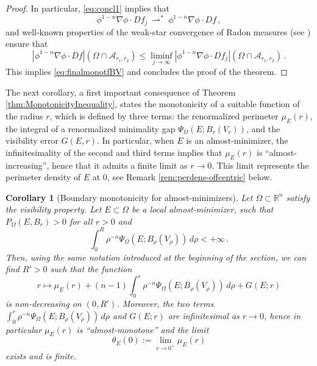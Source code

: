 \documentclass[a4paper,reqno,11pt]{amsart}
\newtheorem{corollary}[theorem]{Corollary}
\newcommand{\R}{\mathbb{R}}
\newcommand{\weakto}{\rightharpoonup}
\newcommand{\ra}{\rightarrow}
\newcommand{\cA}{\mathcal{A}}
\newcommand{\pr}{P_{\Omega}}
\begin{document}
\begin{proof}
		In particular, \eqref{eq:concl1} implies that
		\begin{equation*}
			\phi^{1-n} \nabla \phi \cdot Df_j\ \mathop\weakto^\ast\ \phi^{1-n} \nabla \phi \cdot Df \, ,
		\end{equation*}
		and well-known properties of the weak-star convergence of Radon measures (see \cite{maggi2012sets}) ensure that
		\begin{equation*}
			\left| \phi^{1-n} \nabla \phi \cdot Df \right|(\Omega \cap \cA_{r_{1},r_{2}}) \leq \liminf_{j \ra \infty} \left| \phi^{1-n} \nabla \phi \cdot Df_j \right|(\Omega \cap \cA_{r_{1},r_{2}}) \, .
\end{equation*}
This implies \eqref{eq:finalmonotfBV} and concludes the proof of the theorem.
\end{proof}

The next corollary, a first important consequence of Theorem \ref{thm:MonotonicityInequality}, states the monotonicity of a suitable function of the radius $r$, which is defined by three terms: the renormalized perimeter $\mu_{E}(r)$, the integral of a renormalized minimality gap $\Psi_{\Omega}(E;B_{r}(V_{r}))$, and the visibility error $G(E,r)$. In particular, when $E$ is an almost-minimizer, the infinitesimality of the second and third terms implies that $\mu_{E}(r)$ is ``almost-increasing'', hence that it admits a finite limit as $r\to 0$. This limit represents the perimeter density of $E$ at $0$, see Remark \ref{rem:perdens-offcentric} below. 
\begin{corollary}[Boundary monotonicity for almost-minimizers]\label{cor:BM}
Let $\Omega \subset \R^n$ satisfy the visibility property. Let $E\subset \Omega$ be a local almost-minimizer, such that $\pr(E,B_{r})>0$ for all $r>0$ and 
\[
\int_{0}^{R}\rho^{-n}\Psi_{\Omega}(E;B_{\rho}(V_{\rho}))\, d\rho < +\infty\,.
\]
Then, using the same notation introduced at the beginning of the section, we can find $R'>0$ such that the function
\[
r\mapsto \mu_{E}(r) + (n-1)\int_{0}^{r}\rho^{-n}\Psi_{\Omega}(E;B_{\rho}(V_{\rho}))\, d\rho + G(E;r)
\]
is non-decreasing on $(0,R')$. Moreover, the two terms
$\int_{0}^{r}\rho^{-n}\Psi_{\Omega}(E;B_{\rho}(V_{\rho}))\, d\rho$ and $G(E;r)$ are infinitesimal as $r\to 0$, hence in particular $\mu_{E}(r)$ is ``almost-monotone'' and the limit 
\[
\theta_{E}(0) := \lim_{r\to 0^{+}}\mu_{E}(r)
\] 
exists and is finite. 
\end{corollary}
\end{document}
